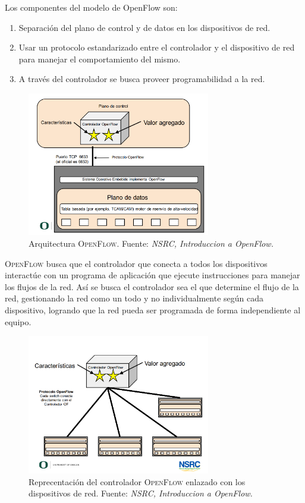 \documentclass[10pt,journal,compsoc]{IEEEtran}
\begin{document}
Los componentes del modelo de OpenFlow son:
\begin{enumerate}
    \item Separación del plano de control y de datos en los dispositivos de red.
    \item Usar un protocolo estandarizado entre el controlador y el dispositivo de red para manejar el comportamiento del mismo.
    \item A través del controlador se busca proveer programabilidad a la red. 
\end{enumerate}

\begin{figure}[h]
    \centering
    \includegraphics[width=8cm]{openFlow1}
    \caption{Arquitectura \textsc{OpenFlow}. Fuente: \emph{NSRC, Introduccion a OpenFlow.}}
    \label{fig:Arquitectura OpenFlow}
\end{figure}

\textsc{OpenFlow} busca que el controlador que conecta a todos los dispositivos interactúe con un programa de aplicación que ejecute instrucciones para manejar los flujos de la red. Así se busca el controlador sea el que determine el flujo de la red, gestionando la red como un todo y no individualmente según cada dispositivo, logrando que la red pueda ser programada de forma independiente al equipo. 

\begin{figure}[h]
    \centering
    \includegraphics[width=8cm]{openFlow2}
    \caption{Reprecentación del controlador \textsc{OpenFlow} enlazado con los dispositivos de red. Fuente: \emph{NSRC, Introduccion a OpenFlow.}}
    \label{fig:Arquitectura OpenFlow}
\end{figure}
\end{document}
